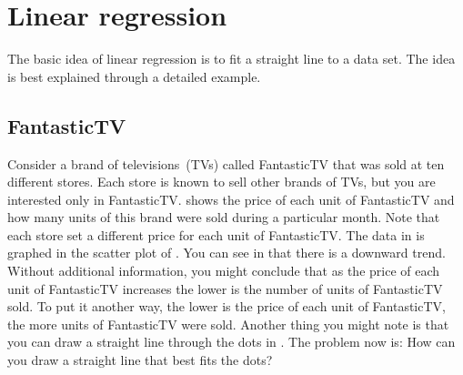\documentclass[a4paper,oneside,12pt]{article}
\begin{document}

\section{Linear regression}

The basic idea of linear regression is to fit a straight line to a
data set.  The idea is best explained through a detailed example.



\subsection*{FantasticTV}

Consider a brand of televisions~(TVs) called FantasticTV that was sold
at ten different stores.  Each store is known to sell other brands of
TVs, but you are interested only in FantasticTV.  
shows the price of each unit of FantasticTV and how many units of this
brand were sold during a particular month.  Note that each store set a
different price for each unit of FantasticTV.  The data in
 is graphed in the scatter plot of
.  You can see in  that there
is a downward trend.  Without additional information, you might
conclude that as the price of each unit of FantasticTV increases the
lower is the number of units of FantasticTV sold.  To put it another
way, the lower is the price of each unit of FantasticTV, the more
units of FantasticTV were sold.  Another thing you might note is that
you can draw a straight line through the dots in .
The problem now is: How can you draw a straight line that best fits
the dots?

\begin{table}[!htbp]
\centering

\caption{%
  The price of each unit of FantasticTV versus the number of units
  sold.  The price is measured in Australian dollars.  The number of
  units sold is during a particular month.  Units of FantasticTV were
  sold across ten different stores, but each store set a different
  price.
}
\label{tab:tv_sold}
\end{table}
\end{document}

